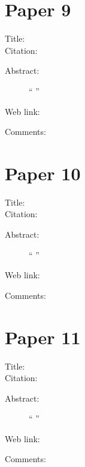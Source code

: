 \documentclass{scrartcl}
\begin{document}
	\section*{Paper 9}
	\begin{description}
		\item[Title:]
		\item[Citation:] \cite{}
		\item[Abstract:] ``
		''
		\item[Web link:] \url{}
		\item[Comments:]
	\end{description}
	
	\section*{Paper 10}
	\begin{description}
		\item[Title:]
		\item[Citation:] \cite{}
		\item[Abstract:] ``
		''
		\item[Web link:] \url{}
		\item[Comments:]
	\end{description}
	
	\section*{Paper 11}
	\begin{description}
		\item[Title:]
		\item[Citation:] \cite{}
		\item[Abstract:] ``
		''
		\item[Web link:] \url{}
		\item[Comments:]
	\end{description}

	

											
	
	
											
\end{document}
